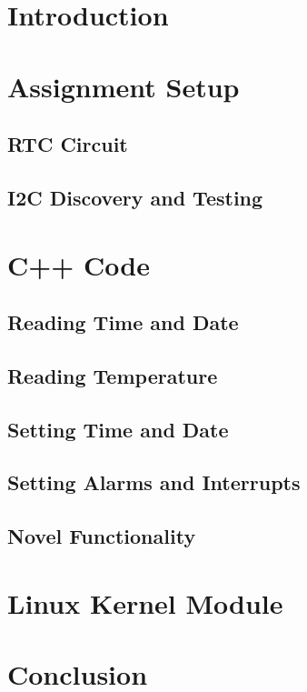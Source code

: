 \documentclass[a4paper 12pt]{article}
\begin{document}
\hypersetup{pageanchor=false}

\hypersetup{pageanchor=true}


\tableofcontents
\clearpage
\section{Introduction}

\section{Assignment Setup}
\subsection{RTC Circuit}

\subsection{I2C Discovery and Testing}

\section{C++ Code}
\subsection{Reading Time and Date}

\subsection{Reading Temperature}

\subsection{Setting Time and Date}

\subsection{Setting Alarms and Interrupts}

\subsection{Novel Functionality}

\section{Linux Kernel Module}

\section{Conclusion}

\clearpage
\printbibliography
\end{document}
